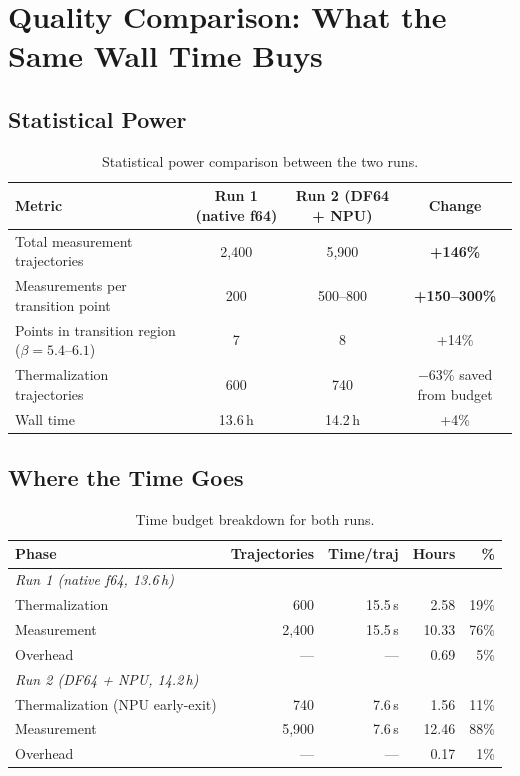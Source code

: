 \documentclass[11pt,a4paper]{article}
\begin{document}
\FloatBarrier
\section{Quality Comparison: What the Same Wall Time Buys}

\subsection{Statistical Power}

\begin{table}[H]
\centering
\caption{Statistical power comparison between the two runs.}
\label{tab:stats}
\renewcommand{\arraystretch}{1.25}
\begin{tabular}{lccc}
\toprule
Metric & Run 1 (native f64) & Run 2 (DF64 + NPU) & Change \\
\midrule
Total measurement trajectories     & 2,400 & 5,900 & \textbf{+146\%} \\
Measurements per transition point  & 200   & 500--800 & \textbf{+150--300\%} \\
Points in transition region ($\beta=5.4$--$6.1$) & 7 & 8 & +14\% \\
Thermalization trajectories        & 600   & 740 & $-$63\% saved from budget \\
Wall time                          & 13.6\,h & 14.2\,h & +4\% \\
\bottomrule
\end{tabular}
\end{table}

\subsection{Where the Time Goes}

\begin{table}[H]
\centering
\caption{Time budget breakdown for both runs.}
\label{tab:time}
\renewcommand{\arraystretch}{1.25}
\begin{tabular}{lrrrr}
\toprule
Phase & Trajectories & Time/traj & Hours & \% \\
\midrule
\multicolumn{5}{l}{\textit{Run 1 (native f64, 13.6\,h)}} \\
\quad Thermalization & 600  & 15.5\,s & 2.58 & 19\% \\
\quad Measurement    & 2,400 & 15.5\,s & 10.33 & 76\% \\
\quad Overhead       &  ---  & ---     & 0.69  &  5\% \\
\midrule
\multicolumn{5}{l}{\textit{Run 2 (DF64 + NPU, 14.2\,h)}} \\
\quad Thermalization (NPU early-exit) & 740 & 7.6\,s & 1.56 & 11\% \\
\quad Measurement                     & 5,900 & 7.6\,s & 12.46 & 88\% \\
\quad Overhead                        & ---   & ---    & 0.17  &  1\% \\
\bottomrule
\end{tabular}
\end{table}
\end{document}
